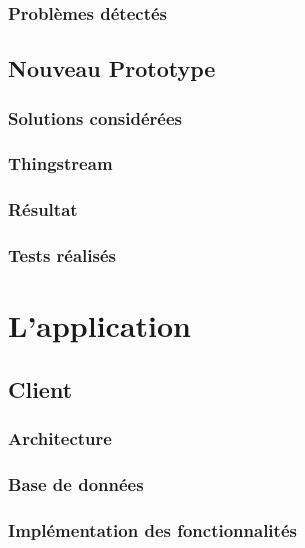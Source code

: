 \subsection{Problèmes détectés}

\section{Nouveau Prototype}

\subsection{Solutions considérées}
\subsection{Thingstream}
\subsection{Résultat}
\subsection{Tests réalisés}

\chapter{L'application}



\section{Client}

\subsection{Architecture}
\subsection{Base de données}

\subsection{Implémentation des fonctionnalités}
